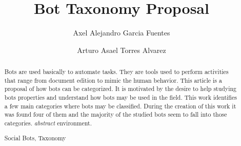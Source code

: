 \documentclass[runningheads,a4paper]{llncs}
\newcommand{\keywords}[1]{\par\addvspace\baselineskip
\noindent\keywordname\enspace\ignorespaces#1}
\begin{document}
\mainmatter  %

\title{Bot Taxonomy Proposal}


%
%
\author{Axel Alejandro Garcia Fuentes%
\and Arturo Asael Torres Alvarez}
%


%
%

\maketitle

\begin{abstract}
Bots are used basically to automate tasks. They are tools used to perform activities that range from document edition to mimic the human behavior.
This article is a proposal of how bots can be categorized. It is motivated by the desire to help studying bots properties and understand how bots may 
be used in the field. This work identifies a few main categories where bots may be classified. During the creation of this work it was found four of them and 
the majority of the studied bots seem to fall into those categories. 
\emph{abstract} environment.
\keywords{Social Bots, Taxonomy}
\end{abstract}
\end{document}
